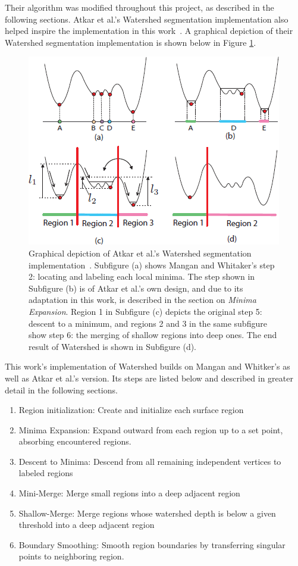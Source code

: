 Their algorithm was modified throughout this project, as described in the following sections.
Atkar et al.'s Watershed segmentation implementation also helped inspire the implementation in this work~\cite{HierSurfSeg_for_autobody_painting}.
A graphical depiction of their Watershed segmentation implementation is shown below in Figure \ref{fig:ws_1570179_steps}.
\begin{figure}[htb]
	\centering
	\includegraphics[width=0.5\linewidth]{../resources/watershed/1570179_WS_steps.png}
\caption{
Graphical depiction of Atkar et al.'s Watershed segmentation implementation~\cite{HierSurfSeg_for_autobody_painting}.
Subfigure (a) shows Mangan and Whitaker's step 2: locating and labeling each local minima.
The step shown in Subfigure (b) is of Atkar et al.'s own design, and due to its adaptation in this work, is described in the section on \textit{Minima Expansion}.
Region 1 in Subfigure (c) depicts the original step 5: descent to a minimum, and regions 2 and 3 in the same subfigure show step 6: the merging of shallow regions into deep ones.
The end result of Watershed is shown in Subfigure (d).
}
	\label{fig:ws_1570179_steps}
\end{figure}

This work's implementation of Watershed builds on Mangan and Whitker's as well as Atkar et al.'s version.
Its steps are listed below and described in greater detail in the following sections.
\begin{enumerate}
	\item Region initialization: Create and initialize each surface region
	\item Minima Expansion: Expand outward from each region up to a set point, absorbing encountered regions.
	\item Descent to Minima: Descend from all remaining independent vertices to labeled regions
	\item Mini-Merge: Merge small regions into a deep adjacent region
	\item Shallow-Merge: Merge regions whose watershed depth is below a given threshold into a deep adjacent region
	\item Boundary Smoothing: Smooth region boundaries by transferring singular points to neighboring region.
\end{enumerate}

